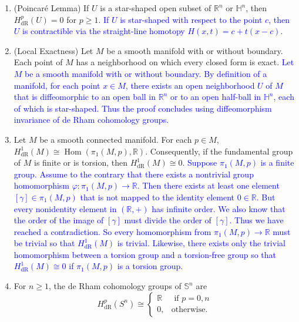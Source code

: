 \documentclass{article}
\newcommand{\expl}[1]{\textcolor{blue}{#1}}
\begin{document}
\begin{enumerate}
		\item (Poincar{\'e} Lemma) If $U$ is a star-shaped open subset of $\mathbb{R}^n$ or $\mathbb{H}^{n}$, then $H^{p}_{\text{dR}}(U) = 0$ for $p \geq 1$. \newline \expl{If $U$ is star-shaped with respect to the point $c$, then $U$ is contractible via the straight-line homotopy $H(x,t) = c + t(x - c)$.}
		
		\item (Local Exactness) Let $M$ be a smooth manifold with or without boundary. Each point of $M$ has a neighborhood on which every closed form is exact. \newline \expl{Let $M$ be a smooth manifold with or without boundary. By definition of a manifold, for each point $x \in M$, there exists an open neighborhood $U$ of $M$ that is diffeomorphic to an open ball in $\mathbb{R}^n$ or to an open half-ball in $\mathbb{H}^{n}$, each of which is star-shaped. Thus the proof concludes using diffeomorphism invariance of de Rham cohomology groups.}
		
		\item Let $M$ be a smooth connected manifold. For each $p \in M$, $H^{1}_{\text{dR}}(M) \cong \operatorname{Hom}(\pi_{1}(M,p), \mathbb{R})$. Consequently, if the fundamental group of $M$ is finite or is torsion, then $H^{1}_{\text{dR}}(M) \cong 0$. \newline \expl{Suppose $\pi_{1}(M,p)$ is a finite group. Assume to the contrary that there exists a nontrivial group homomorphism $\varphi: \pi_1(M,p) \to \mathbb{R}$. Then there exists at least one element $[\gamma] \in \pi_{1}(M,p)$ that is not mapped to the identity element $0 \in \mathbb{R}$. But every nonidentity element in $(\mathbb{R}, +)$ has infinite order. We also know that the order of the image of $[\gamma]$ must divide the order of $[\gamma]$. Thus we have reached a contradiction. So every homomorphism from $\pi_{1}(M,p) \to \mathbb{R}$ must be trivial so that $H^{1}_{\text{dR}}(M)$ is trivial. Likewise, there exists only the trivial homomorphism between a torsion group and a torsion-free group so that $H^{1}_{\text{dR}}(M) \cong 0$ if $\pi_1(M,p)$ is a torsion group.}
		
		\item For $n\geq 1$, the de Rham cohomology groups of $\mathbb{S}^n$ are 
		\begin{equation*}
			H^{p}_{\text{dR}}(S^{n}) \cong 
			\begin{cases}
				\mathbb{R} & \text{ if $p = 0, n$} \\
				0, & \text{otherwise}. 
			\end{cases}
		\end{equation*}
		

\end{enumerate}
\end{document}
